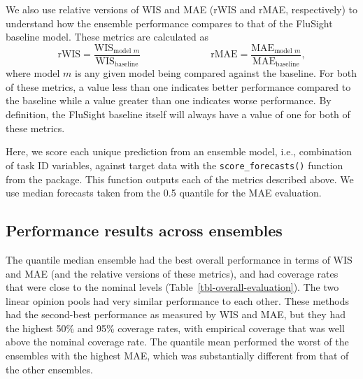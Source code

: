 \documentclass[
  article,
  shortnames,
  notitle]{jss}
\begin{document}
We also use relative versions of WIS and MAE (rWIS and rMAE,
respectively) to understand how the ensemble performance compares to
that of the FluSight baseline model. These metrics are calculated as
\[\textrm{rWIS} = \frac{\textrm{WIS}_{\textrm{model }m}}{\textrm{WIS}_{\textrm{baseline}}} \hspace{3cm} \textrm{rMAE} = \frac{\textrm{MAE}_{\textrm{model }m}}{\textrm{MAE}_{\textrm{baseline}}},\]
where model \(m\) is any given model being compared against the
baseline. For both of these metrics, a value less than one indicates
better performance compared to the baseline while a value greater than
one indicates worse performance. By definition, the FluSight baseline
itself will always have a value of one for both of these metrics.

Here, we score each unique prediction from an ensemble model, i.e.,
combination of task ID variables, against target data with the
\texttt{score\_forecasts()} function from the 
package. This function outputs each of the metrics described above. We
use median forecasts taken from the 0.5 quantile for the MAE evaluation.

\subsection{Performance results across
ensembles}\label{performance-results-across-ensembles}

The quantile median ensemble had the best overall performance in terms
of WIS and MAE (and the relative versions of these metrics), and had
coverage rates that were close to the nominal levels
(Table~\ref{tbl-overall-evaluation}). The two linear opinion pools had
very similar performance to each other. These methods had the
second-best performance as measured by WIS and MAE, but they had the
highest 50\% and 95\% coverage rates, with empirical coverage that was
well above the nominal coverage rate. The quantile mean performed the
worst of the ensembles with the highest MAE, which was substantially
different from that of the other ensembles.
\end{document}
